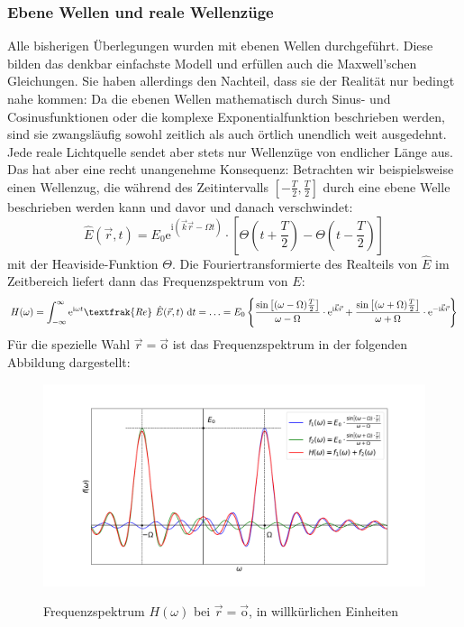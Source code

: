 \documentclass[german,  %
parskip=full,  %
]{scrartcl}
\begin{document}
\subsubsection{Ebene Wellen und reale Wellenzüge}
Alle bisherigen Überlegungen wurden mit ebenen Wellen durchgeführt. Diese bilden das denkbar einfachste Modell und erfüllen auch die Maxwell'schen Gleichungen. Sie haben allerdings den Nachteil, dass sie der Realität nur bedingt nahe kommen: Da die ebenen Wellen mathematisch durch Sinus- und Cosinusfunktionen oder die komplexe Exponentialfunktion beschrieben werden, sind sie zwangsläufig sowohl zeitlich als auch örtlich unendlich weit ausgedehnt. Jede reale Lichtquelle sendet aber stets nur Wellenzüge von endlicher Länge aus. Das hat aber eine recht unangenehme Konsequenz: Betrachten wir beispielsweise einen Wellenzug, die während des Zeitintervalls \(\left[-\frac{T}{2},\frac{T}{2}\right]\) durch eine ebene Welle beschrieben werden kann und davor und danach verschwindet:
\[\hat{E}(\vec{r},t) = E_0 \mathrm{e}^{\mathrm{i}(\vec{k}\vec{r} - \Omega t)} \cdot\left[\Theta\left(t+\frac{T}{2}\right) - \Theta\left(t-\frac{T}{2}\right)\right]\]
mit der Heaviside-Funktion \(\Theta\). Die Fouriertransformierte des Realteils von \(\hat{E}\) im Zeitbereich liefert dann das Frequenzspektrum von \(E\):
\begin{align*}
H(\omega) = \int_{-\infty}^{\infty} \mathrm{e}^{\mathrm{i}\omega t}\textfrak{Re} \ \hat{E}(\vec{r},t) \ \mathrm{d} t = \hdots = E_0 \left\lbrace   \frac{\sin\left[(\omega - \Omega)\frac{T}{2}\right]}{\omega - \Omega} \cdot \mathrm{e}^{\mathrm{i}\vec{k}\vec{r}} +  \frac{\sin\left[(\omega + \Omega)\frac{T}{2}\right]}{\omega + \Omega} \cdot \mathrm{e}^{-\mathrm{i}\vec{k}\vec{r}}\right\rbrace
\end{align*}
Für die spezielle Wahl \(\vec{r} = \vec{\mathrm{o}}\) ist das Frequenzspektrum in der folgenden Abbildung dargestellt:
\newpage
\begin{figure}[h!]\centering
\includegraphics[scale=0.4]{Frequenzspektrum.png}
\label{Frequenzspqktrum}
\caption{Frequenzspektrum \(H(\omega)\) bei \(\vec{r} = \vec{\mathrm{o}}\), in willkürlichen Einheiten}
\end{figure}
\end{document}
